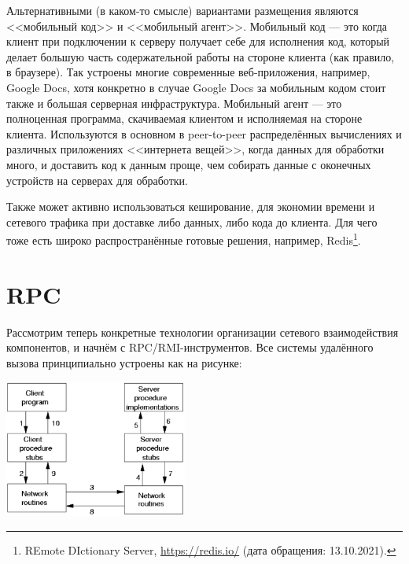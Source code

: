 \documentclass[a5paper]{article}
\begin{document}
Альтернативными (в каком-то смысле) вариантами размещения являются <<мобильный код>> и <<мобильный агент>>. Мобильный код --- это когда клиент при подключении к серверу получает себе для исполнения код, который делает большую часть содержательной работы на стороне клиента (как правило, в браузере). Так устроены многие современные веб-приложения, например, Google Docs, хотя конкретно в случае Google Docs за мобильным кодом стоит также и большая серверная инфраструктура. Мобильный агент --- это полноценная программа, скачиваемая клиентом и исполняемая на стороне клиента. Используются в основном в peer-to-peer распределённых вычислениях и различных приложениях <<интернета вещей>>, когда данных для обработки много, и доставить код к данным проще, чем собирать данные с оконечных устройств на серверах для обработки.

Также может активно использоваться кеширование, для экономии времени и сетевого трафика при доставке либо данных, либо кода до клиента. Для чего тоже есть широко распространённые готовые решения, например, Redis\footnote{REmote DIctionary Server, \url{https://redis.io/} (дата обращения: 13.10.2021).}.

\section{RPC}

Рассмотрим теперь конкретные технологии организации сетевого взаимодействия компонентов, и начнём с RPC/RMI-инструментов. Все системы удалённого вызова принципиально устроены как на рисунке:

\begin{center}
    \includegraphics[width=0.45\textwidth]{rpc.png}
\end{center}
\end{document}
